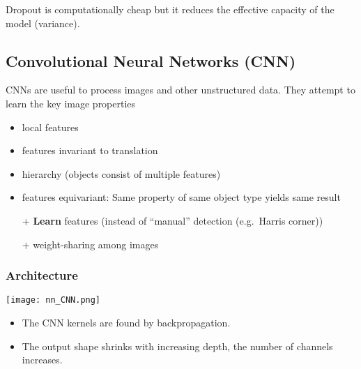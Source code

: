 
\newpar{}
Dropout is computationally cheap but it reduces the effective capacity of the model (variance).

\subsection{Convolutional Neural Networks (CNN)}

CNNs are useful to process images and other unstructured data. They attempt to learn the key image properties
\begin{itemize}
    \item local features
    \item features invariant to translation
    \item hierarchy (objects consist of multiple features)
    \item features equivariant: Same property of same object type yields same result
\end{itemize}

\newpar{}
\begin{itemize}
    \item [+] \textbf{Learn} features (instead of ``manual'' detection (e.g.\ Harris corner))
    \item [+] weight-sharing among images
\end{itemize}

\subsubsection{Architecture}
\begin{center}
    \texttt{[image: nn\_CNN.png]}
\end{center}
\newpar{}
\begin{itemize}
    \item The CNN kernels are found by backpropagation.
    \item The output shape shrinks with increasing depth, the number of channels increases.
\end{itemize}


